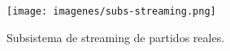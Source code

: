 \begin{figure}[H]
  \centering
  \texttt{[image: imagenes/subs-streaming.png]}
  \caption{Subsistema de streaming de partidos reales.}
\end{figure}
